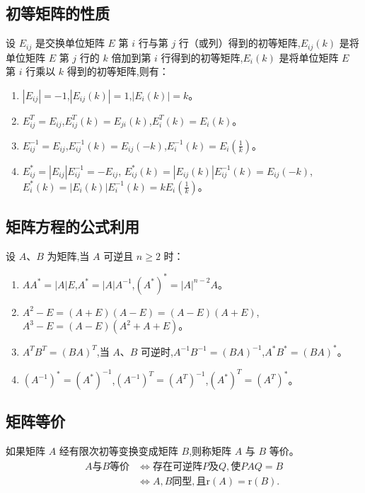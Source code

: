 \documentclass[UTF8]{ctexart}
\theoremstyle{remark}
\begin{document}
	\subsection{初等矩阵的性质}
	设 \(E_{ij}\) 是交换单位矩阵 \(E\) 第 \(i\) 行与第 \(j\) 行（或列）得到的初等矩阵,\(E_{ij}(k)\) 是将单位矩阵 \(E\) 第 \(j\) 行的 \(k\) 倍加到第 \(i\) 行得到的初等矩阵,\(E_{i}(k)\) 是将单位矩阵 \(E\) 第 \(i\) 行乘以 \(k\) 得到的初等矩阵,则有：
	\begin{enumerate}
		\item \(|E_{ij}| = -1\),\(|E_{ij}(k)| = 1\),\(|E_{i}(k)| = k\)。
		\item \(E_{ij}^T = E_{ij}\),\(E_{ij}^T(k) = E_{ji}(k)\),\(E_{i}^T(k) = E_{i}(k)\)。
		\item \(E_{ij}^{-1} = E_{ij}\),\(E_{ij}^{-1}(k) = E_{ij}(-k)\),\(E_{i}^{-1}(k) = E_{i}(\frac{1}{k})\)。
		\item \(E_{ij}^* = |E_{ij}|E_{ij}^{-1} = -E_{ij}\),
		\(E_{ij}^*(k) = |E_{ij}(k)|E_{ij}^{-1}(k) = E_{ij}(-k)\),
		\(E_{i}^*(k) = |E_{i}(k)|E_{i}^{-1}(k) = kE_{i}(\frac{1}{k})\)。
	\end{enumerate}
	
	\subsection{矩阵方程的公式利用}
	设 \(A\)、\(B\) 为矩阵,当 \(A\) 可逆且 \(n\geq2\) 时：
	\begin{enumerate}
		\item \(AA^* = |A|E\),\(A^* = |A|A^{-1}\),\((A^*)^* = |A|^{n - 2}A\)。
		\item \(A^2 - E = (A + E)(A - E) = (A - E)(A + E)\),\(A^3 - E = (A - E)(A^2 + A + E)\)。
		\item \(A^T B^T = (BA)^T\),当 \(A\)、\(B\) 可逆时,\(A^{-1}B^{-1} = (BA)^{-1}\),\(A^*B^* = (BA)^*\)。
		\item \((A^{-1})^* = (A^*)^{-1}\),\((A^{-1})^T = (A^T)^{-1}\),\((A^*)^T = (A^T)^*\)。
	\end{enumerate}
	
	\subsection{矩阵等价}
	如果矩阵 \(A\) 经有限次初等变换变成矩阵 \(B\),则称矩阵 \(A\) 与 \(B\) 等价。
	\begin{align*}
		A与B等价 &\Leftrightarrow 存在可逆阵P及Q,使PAQ = B\\
		&\Leftrightarrow A, B同型,且\mathrm{r}(A)=\mathrm{r}(B).
	\end{align*}
\end{document}
